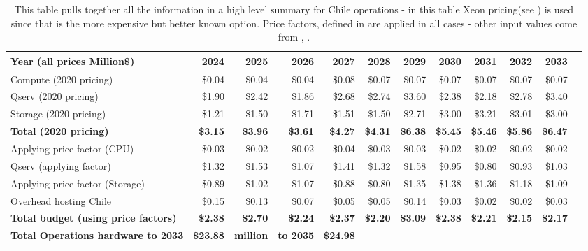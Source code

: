 \tiny \begin{longtable} { |p{}  |r  |r  |r  |r  |r  |r  |r  |r  |r  |r  |r |} 
\caption{This table pulls together all the information in a high level summary for Chile operations - in this table Xeon pricing(see ) is used since that is the more expensive but better known option. Price factors, defined in  are applied in all cases - other input values come from , .
 \label{tab:opsSumChile}}\\ 
\hline 
\textbf{Year  (all prices Million\$)}&\textbf{2024}&\textbf{2025}&\textbf{2026}&\textbf{2027}&\textbf{2028}&\textbf{2029}&\textbf{2030}&\textbf{2031}&\textbf{2032}&\textbf{2033} \\ \hline
{Compute (2020 pricing)}&{\$0.04}&{\$0.04}&{\$0.04}&{\$0.08}&{\$0.07}&{\$0.07}&{\$0.07}&{\$0.07}&{\$0.07}&{\$0.07} \\ \hline
{Qserv (2020 pricing)}&{\$1.90}&{\$2.42}&{\$1.86}&{\$2.68}&{\$2.74}&{\$3.60}&{\$2.38}&{\$2.18}&{\$2.78}&{\$3.40} \\ \hline
{Storage (2020 pricing)}&{\$1.21}&{\$1.50}&{\$1.71}&{\$1.51}&{\$1.50}&{\$2.71}&{\$3.00}&{\$3.21}&{\$3.01}&{\$3.00} \\ \hline
\textbf{Total (2020 pricing)}&\textbf{\$3.15}&\textbf{\$3.96}&\textbf{\$3.61}&\textbf{\$4.27}&\textbf{\$4.31}&\textbf{\$6.38}&\textbf{\$5.45}&\textbf{\$5.46}&\textbf{\$5.86}&\textbf{\$6.47} \\ \hline
{Applying price factor (CPU)}&{\$0.03}&{\$0.02}&{\$0.02}&{\$0.04}&{\$0.03}&{\$0.03}&{\$0.02}&{\$0.02}&{\$0.02}&{\$0.02} \\ \hline
{Qserv (applying factor)}&{\$1.32}&{\$1.53}&{\$1.07}&{\$1.41}&{\$1.32}&{\$1.58}&{\$0.95}&{\$0.80}&{\$0.93}&{\$1.03} \\ \hline
{Applying price factor (Storage)}&{\$0.89}&{\$1.02}&{\$1.07}&{\$0.88}&{\$0.80}&{\$1.35}&{\$1.38}&{\$1.36}&{\$1.18}&{\$1.09} \\ \hline
{Overhead hosting Chile}&{\$0.15}&{\$0.13}&{\$0.07}&{\$0.05}&{\$0.05}&{\$0.14}&{\$0.03}&{\$0.02}&{\$0.02}&{\$0.03} \\ \hline
\textbf{Total budget (using price factors)}&\textbf{\$2.38}&\textbf{\$2.70}&\textbf{\$2.24}&\textbf{\$2.37}&\textbf{\$2.20}&\textbf{\$3.09}&\textbf{\$2.38}&\textbf{\$2.21}&\textbf{\$2.15}&\textbf{\$2.17} \\ \hline
\textbf{Total Operations hardware to 2033}&\textbf{\$23.88}&\textbf{million}&\textbf{to 2035}&\textbf{\$24.98}&&&&&& \\ \hline
\end{longtable} \normalsize
